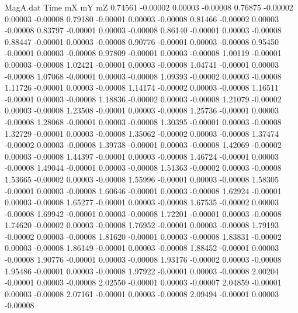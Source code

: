 \begin{filecontents}{MagA.dat}
Time mX mY mZ
   0.74561   -0.00002    0.00003   -0.00008
   0.76875   -0.00002    0.00003   -0.00008
   0.79180   -0.00001    0.00003   -0.00008
   0.81466   -0.00002    0.00003   -0.00008
   0.83797   -0.00001    0.00003   -0.00008
   0.86140   -0.00001    0.00003   -0.00008
   0.88447   -0.00001    0.00003   -0.00008
   0.90776   -0.00001    0.00003   -0.00008
   0.95450   -0.00001    0.00003   -0.00008
   0.97809   -0.00001    0.00003   -0.00008
   1.00119   -0.00001    0.00003   -0.00008
   1.02421   -0.00001    0.00003   -0.00008
   1.04741   -0.00001    0.00003   -0.00008
   1.07068   -0.00001    0.00003   -0.00008
   1.09393   -0.00002    0.00003   -0.00008
   1.11726   -0.00001    0.00003   -0.00008
   1.14174   -0.00002    0.00003   -0.00008
   1.16511   -0.00001    0.00003   -0.00008
   1.18836   -0.00002    0.00003   -0.00008
   1.21079   -0.00002    0.00003   -0.00008
   1.23508   -0.00001    0.00003   -0.00008
   1.25736   -0.00001    0.00003   -0.00008
   1.28068   -0.00001    0.00003   -0.00008
   1.30395   -0.00001    0.00003   -0.00008
   1.32729   -0.00001    0.00003   -0.00008
   1.35062   -0.00002    0.00003   -0.00008
   1.37474   -0.00002    0.00003   -0.00008
   1.39738   -0.00001    0.00003   -0.00008
   1.42069   -0.00002    0.00003   -0.00008
   1.44397   -0.00001    0.00003   -0.00008
   1.46724   -0.00001    0.00003   -0.00008
   1.49044   -0.00001    0.00003   -0.00008
   1.51363   -0.00002    0.00003   -0.00008
   1.53665   -0.00002    0.00003   -0.00008
   1.55996   -0.00001    0.00003   -0.00008
   1.58305   -0.00001    0.00003   -0.00008
   1.60646   -0.00001    0.00003   -0.00008
   1.62924   -0.00001    0.00003   -0.00008
   1.65277   -0.00001    0.00003   -0.00008
   1.67535   -0.00002    0.00003   -0.00008
   1.69942   -0.00001    0.00003   -0.00008
   1.72201   -0.00001    0.00003   -0.00008
   1.74620   -0.00002    0.00003   -0.00008
   1.76952   -0.00001    0.00003   -0.00008
   1.79193   -0.00002    0.00003   -0.00008
   1.81620   -0.00001    0.00003   -0.00008
   1.83831   -0.00002    0.00003   -0.00008
   1.86149   -0.00001    0.00003   -0.00008
   1.88452   -0.00001    0.00003   -0.00008
   1.90776   -0.00001    0.00003   -0.00008
   1.93176   -0.00002    0.00003   -0.00008
   1.95486   -0.00001    0.00003   -0.00008
   1.97922   -0.00001    0.00003   -0.00008
   2.00204   -0.00001    0.00003   -0.00008
   2.02550   -0.00001    0.00003   -0.00007
   2.04859   -0.00001    0.00003   -0.00008
   2.07161   -0.00001    0.00003   -0.00008
   2.09494   -0.00001    0.00003   -0.00008

\end{filecontents}
